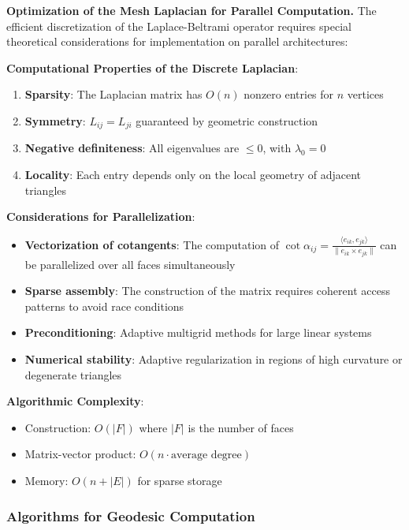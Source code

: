 \textbf{Optimization of the Mesh Laplacian for Parallel Computation.} The efficient discretization of the Laplace-Beltrami operator requires special theoretical considerations for implementation on parallel architectures:

\textbf{Computational Properties of the Discrete Laplacian}:
\begin{enumerate}
    \item \textbf{Sparsity}: The Laplacian matrix has $O(n)$ nonzero entries for $n$ vertices
    \item \textbf{Symmetry}: $L_{ij} = L_{ji}$ guaranteed by geometric construction
    \item \textbf{Negative definiteness}: All eigenvalues are $\leq 0$, with $\lambda_0 = 0$
    \item \textbf{Locality}: Each entry depends only on the local geometry of adjacent triangles
\end{enumerate}

\textbf{Considerations for Parallelization}:
\begin{itemize}
    \item \textbf{Vectorization of cotangents}: The computation of $\cot \alpha_{ij} = \frac{\langle e_{ik}, e_{jk} \rangle}{\|e_{ik} \times e_{jk}\|}$ can be parallelized over all faces simultaneously
    \item \textbf{Sparse assembly}: The construction of the matrix requires coherent access patterns to avoid race conditions
    \item \textbf{Preconditioning}: Adaptive multigrid methods for large linear systems
    \item \textbf{Numerical stability}: Adaptive regularization in regions of high curvature or degenerate triangles
\end{itemize}

\textbf{Algorithmic Complexity}:
\begin{itemize}
    \item Construction: $O(|F|)$ where $|F|$ is the number of faces
    \item Matrix-vector product: $O(n \cdot \text{average degree})$
    \item Memory: $O(n + |E|)$ for sparse storage
\end{itemize}

\subsubsection{Algorithms for Geodesic Computation}\label{subsubsec:calculo_geodesicas}

